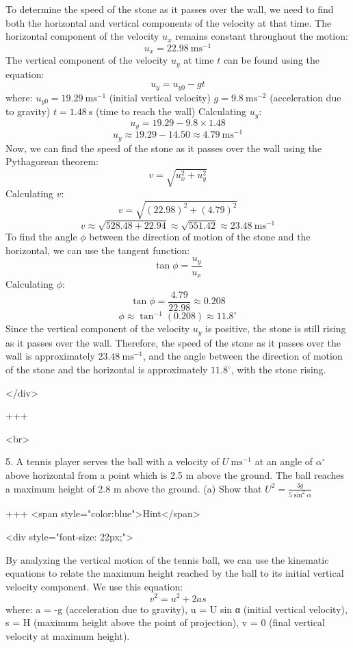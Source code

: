 To determine the speed of the stone as it passes over the wall, we need to find both the horizontal and vertical components of the velocity at that time.
The horizontal component of the velocity $u_x$ remains constant throughout the motion:
$$ u_x = 22.98 \mathrm{~ms}^{-1} $$
The vertical component of the velocity $u_y$ at time $t$ can be found using the equation:
$$ u_y = u_{y0} - gt $$
where:
$u_{y0} = 19.29 \mathrm{~ms}^{-1}$ (initial vertical velocity)
$g = 9.8 \mathrm{~ms}^{-2}$ (acceleration due to gravity)
$t = 1.48 \mathrm{~s}$ (time to reach the wall)
Calculating $u_y$:
$$ u_y = 19.29 - 9.8 \times 1.48 $$
$$ u_y \approx 19.29 - 14.50 \approx 4.79 \mathrm{~ms}^{-1} $$
Now, we can find the speed of the stone as it passes over the wall using the Pythagorean theorem:
$$ v = \sqrt{u_x^2 + u_y^2} $$
Calculating $v$:
$$ v = \sqrt{(22.98)^2 + (4.79)^2} $$
$$ v \approx \sqrt{528.48 + 22.94} \approx \sqrt{551.42} \approx 23.48 \mathrm{~ms}^{-1} $$
To find the angle $\phi$ between the direction of motion of the stone and the horizontal, we can use the tangent function:
$$ \tan \phi = \frac{u_y}{u_x} $$
Calculating $\phi$:
$$ \tan \phi = \frac{4.79}{22.98} \approx 0.208 $$
$$ \phi \approx \tan^{-1}(0.208) \approx 11.8^{\circ} $$
Since the vertical component of the velocity $u_y$ is positive, the stone is still rising as it passes over the wall.
Therefore, the speed of the stone as it passes over the wall is approximately $23.48 \mathrm{~ms}^{-1}$, and the angle between the direction of motion of the stone and the horizontal is approximately $11.8^{\circ}$, with the stone rising.

</div>

+++

<br>

5. A tennis player serves the ball with a velocity of $U \mathrm{~ms}^{-1}$ at an angle of $\alpha^{\circ}$ above horizontal from a point which is 2.5 m above the ground. The ball reaches a maximum height of 2.8 m above the ground.
(a) Show that $U^{2}=\frac{3 g}{5 \sin ^{2} \alpha}$

+++ <span style="color:blue">Hint</span>

<div style="font-size: 22px;">

By analyzing the vertical motion of the tennis ball, we can use the kinematic equations to relate the maximum height reached by the ball to its initial vertical velocity component.
We use this equation:
$$ v^2 = u^2 + 2 a s $$
where: 
a = -g (acceleration due to gravity),
u = U sin α (initial vertical velocity),
s = H (maximum height above the point of projection),
v = 0 (final vertical velocity at maximum height).


